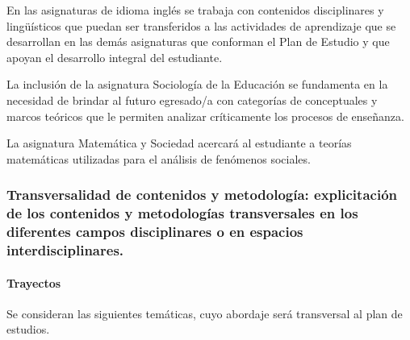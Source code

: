 \documentclass[a4paper, 12pt]{article}
\begin{document}
En las asignaturas de idioma inglés  se trabaja con contenidos disciplinares y lingüísticos que puedan ser transferidos a las actividades de aprendizaje que se desarrollan en las demás asignaturas que conforman el Plan de Estudio y que apoyan el desarrollo integral del estudiante.

La inclusión de la asignatura Sociología de la Educación se fundamenta en la necesidad de brindar al futuro egresado/a con categorías de conceptuales y marcos teóricos que le permiten analizar críticamente los procesos de enseñanza. 

La asignatura Matemática y Sociedad acercará al estudiante a teorías matemáticas utilizadas para el análisis de fenómenos sociales. 

\subsubsection{Transversalidad de contenidos y metodología: explicitación de los contenidos y metodologías transversales en los diferentes campos disciplinares o en espacios interdisciplinares.}


\paragraph{Trayectos}

Se consideran las siguientes temáticas, cuyo abordaje será transversal al plan de estudios. 
\end{document}
